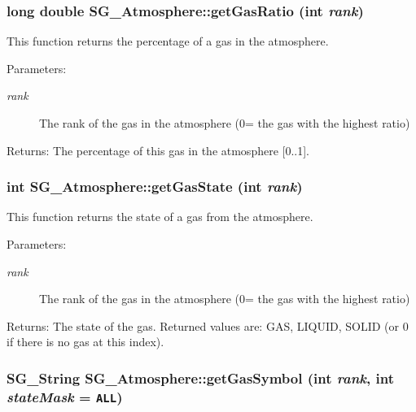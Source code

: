 \subsubsection{\setlength{\rightskip}{0pt plus 5cm}long double SG\_\-Atmosphere::get\-Gas\-Ratio (int {\em rank})}\label{class_s_g___atmosphere_a8}


This function returns the percentage of a gas in the atmosphere. 

\begin{Desc}
\item[Parameters:]
\begin{description}
\item[{\em rank}]The rank of the gas in the atmosphere (0= the gas with the highest ratio) \end{description}
\end{Desc}
\begin{Desc}
\item[Returns:]The percentage of this gas in the atmosphere [0..1]. \end{Desc}
\subsubsection{\setlength{\rightskip}{0pt plus 5cm}int SG\_\-Atmosphere::get\-Gas\-State (int {\em rank})}\label{class_s_g___atmosphere_a9}


This function returns the state of a gas from the atmosphere. 

\begin{Desc}
\item[Parameters:]
\begin{description}
\item[{\em rank}]The rank of the gas in the atmosphere (0= the gas with the highest ratio) \end{description}
\end{Desc}
\begin{Desc}
\item[Returns:]The state of the gas. Returned values are: GAS, LIQUID, SOLID (or 0 if there is no gas at this index). \end{Desc}
\subsubsection{\setlength{\rightskip}{0pt plus 5cm}SG\_\-String SG\_\-Atmosphere::get\-Gas\-Symbol (int {\em rank}, int {\em state\-Mask} = {\tt ALL})}\label{class_s_g___atmosphere_a6}


